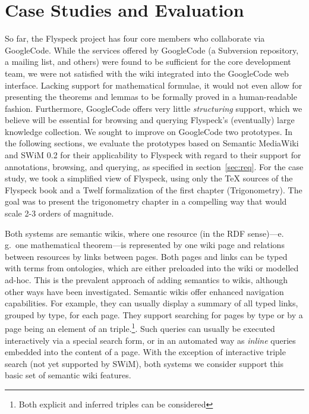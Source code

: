 
\section{Case Studies and Evaluation}

So far, the Flyspeck project has four core members who collaborate via
GoogleCode\cite{website:GoogleCode}.  While the services offered by
GoogleCode (a Subversion repository, a mailing list, and others) were
found to be sufficient for the core development team, we were not
satisfied with the wiki integrated into the GoogleCode web interface.
Lacking support for mathematical formulae, it would not even allow for
presenting the theorems and lemmas to be formally proved in a
human-readable fashion.  Furthermore, GoogleCode offers very
little \emph{structuring} support, which we believe will be
essential for browsing and querying Flyspeck's 
(eventually) large knowledge collection.  We sought to improve
on GoogleCode two prototypes.  
In the following sections, we evaluate the prototypes based on Semantic
MediaWiki and SWiM 0.2 for their applicability to Flyspeck with regard to their
support for annotations, browsing, and querying, as specified in
section~\ref{sec:req}.  For the case study, we took a simplified 
view of Flyspeck, using only the {\TeX} sources of the
Flyspeck book and a Twelf formalization of the first chapter (Trigonometry).
The goal was to present the trigonometry chapter in a compelling way
that would scale 2-3 orders of magnitude.  

Both systems are semantic wikis, where one resource (in the RDF
sense)---e.\,g.\ one mathematical theorem---is represented by one wiki
page and relations between resources by links between pages.  Both
pages and links can be typed with terms from
ontologies\cite{OrDeMoVoHa06:annotation-navigation-semwiki}, which are
either preloaded into the wiki or modelled
ad-hoc\cite{KrSchVr:semwiki-reasoning07}.  This is the prevalent
approach of adding semantics to wikis, although other ways have been
investigated\cite{semwiki06}.  Semantic wikis offer enhanced
navigation capabilities.   For example, they can usually display
a summary of all typed links, grouped by type, for each page.  They support
searching for pages by type or by a page being an element of an
triple.\footnote{Both explicit and inferred triples can be considered\cite{KrSchVr:semwiki-reasoning07}}.  Such queries can
usually be executed interactively via a special search form, or in an
automated way as \emph{inline} queries 
embedded into the content of a
page.  With the exception of interactive triple search (not yet
supported by SWiM), both systems we consider support this basic set of semantic
wiki features.

